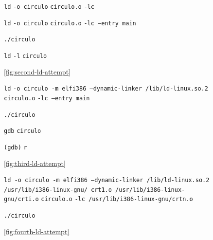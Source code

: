 \documentclass[11pt]{article}
\newcommand{\codetext}[2]{\large\texttt{\textcolor{#1}{#2}}}
\newcommand{\imagecaption}[1]{\vspace{-7pt}\caption*{\char91\ref{fig:#1}\char93}}
\begin{document}
		\begin{figure}[H]
			\centering
			\begin{code-box}
				\codetext{light-blue}{ld} \codetext{orange-desert-vim}{-o circulo} \codetext{light-red}{circulo.o} \codetext{orange-desert-vim}{-lc}
				
				\codetext{light-blue}{ld} \codetext{orange-desert-vim}{-o circulo} \codetext{light-red}{circulo.o} \codetext{orange-desert-vim}{-lc --entry main}
				
				\codetext{light-blue}{./circulo}
				
				\codetext{light-blue}{ld} \codetext{orange-desert-vim}{-l} \codetext{light-red}{circulo}
			\end{code-box}
			\imagecaption{second-ld-attempt}
		\end{figure}
		
		\begin{figure}[H]
			\centering
			\begin{code-box}
				\codetext{light-blue}{ld} \codetext{orange-desert-vim}{-o circulo -m elf\textunderscore\/i386 --dynamic-linker /lib/ld-linux.so.2} \codetext{light-red}{circulo.o} \codetext{orange-desert-vim}{-lc --entry main}
				
				\codetext{light-blue}{./circulo}
				
				\codetext{light-blue}{gdb} \codetext{light-red}{circulo}
				
				\codetext{light-green}{(gdb)} \codetext{light-blue}{r}
			\end{code-box}
			\imagecaption{third-ld-attempt}
		\end{figure}
		
		\begin{figure}[H]
			\centering
			\begin{code-box}
				\codetext{light-blue}{ld }\codetext{orange-desert-vim}{-o circulo -m elf\textunderscore\/i386 --dynamic-linker /lib/ld-linux.so.2 /usr/lib/i386-linux-gnu/ crt1.o /usr/lib/i386-linux-gnu/crti.o} \codetext{light-red}{circulo.o} \codetext{orange-desert-vim}{-lc /usr/lib/i386-linux-gnu/crtn.o}
				
				\codetext{light-blue}{./circulo}
			\end{code-box}
			\imagecaption{fourth-ld-attempt}
		\end{figure}
		
		
		
		
		
		
		
		
		
		
				

		


















\end{document}
